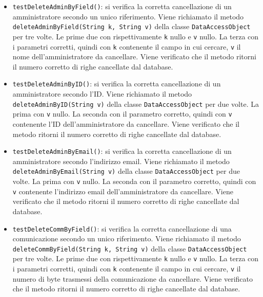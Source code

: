 {{\begin{itemize}
\begin{itemize}
\begin{itemize}
						\item \texttt{testDeleteAdminByField()}: si verifica la corretta cancellazione di un amministratore secondo un unico riferimento. Viene richiamato il metodo \texttt{deleteAdminByField(String k, String v)} della classe \newline \texttt{DataAccessObject} per tre volte. Le prime due con rispettivamente \texttt{k} nullo e \texttt{v} nullo. La terza con i parametri corretti, quindi con \texttt{k} contenente il campo in cui cercare, \texttt{v} il nome dell'amministratore da cancellare. Viene verificato che il metodo ritorni il numero corretto di righe cancellate dal database.
						
						\item \texttt{testDeleteAdminByID()}: si verifica la corretta cancellazione di un amministratore secondo l'ID. Viene richiamato il metodo \newline \texttt{deleteAdminByID(String v)} della classe \texttt{DataAccessObject} per due volte. La prima con \texttt{v} nullo. La seconda con il parametro corretto, quindi con \texttt{v} contenente l'ID dell'amministratore da cancellare. Viene verificato che il metodo ritorni il numero corretto di righe cancellate dal database.
						
						\item \texttt{testDeleteAdminByEmail()}: si verifica la corretta cancellazione di un amministratore secondo l'indirizzo email. Viene richiamato il metodo \texttt{deleteAdminByEmail(String v)} della classe \texttt{DataAccessObject} per due volte. La prima con \texttt{v} nullo. La seconda con il parametro corretto, quindi con \texttt{v} contenente l'indirizzo email dell'amministratore da cancellare. Viene verificato che il metodo ritorni il numero corretto di righe cancellate dal database.
						
						\item \texttt{testDeleteCommByField()}: si verifica la corretta cancellazione di una comunicazione secondo un unico riferimento. Viene richiamato il metodo \texttt{deleteCommByField(String k, String v)} della classe \newline \texttt{DataAccessObject} per tre volte. Le prime due con rispettivamente \texttt{k} nullo e \texttt{v} nullo. La terza con i parametri corretti, quindi con \texttt{k} contenente il campo in cui cercare, \texttt{v} il numero di byte trasmessi della comunicazione da cancellare. Viene verificato che il metodo ritorni il numero corretto di righe cancellate dal database.
					\end{itemize}
					

\end{itemize}
\end{itemize}}}
